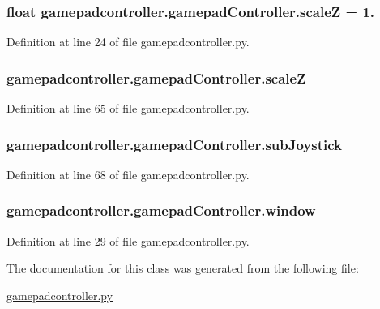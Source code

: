 \hypertarget{classgamepadcontroller_1_1gamepadController_a3d34de8357dd41a4a63cdb3dd38569d1}{
\subsubsection[{scale\-Z}]{\setlength{\rightskip}{0pt plus 5cm}float gamepadcontroller.\-gamepad\-Controller.\-scale\-Z = 1.\hspace{0.3cm}{\ttfamily [static]}}}\label{classgamepadcontroller_1_1gamepadController_a3d34de8357dd41a4a63cdb3dd38569d1}


Definition at line 24 of file gamepadcontroller.\-py.

\hypertarget{classgamepadcontroller_1_1gamepadController_a80be0bf69c042473e69428bb39988494}{
\subsubsection[{scale\-Z}]{\setlength{\rightskip}{0pt plus 5cm}gamepadcontroller.\-gamepad\-Controller.\-scale\-Z}}\label{classgamepadcontroller_1_1gamepadController_a80be0bf69c042473e69428bb39988494}


Definition at line 65 of file gamepadcontroller.\-py.

\hypertarget{classgamepadcontroller_1_1gamepadController_aa6797c1d03e7d3c9aa483ae386b25c52}{
\subsubsection[{sub\-Joystick}]{\setlength{\rightskip}{0pt plus 5cm}gamepadcontroller.\-gamepad\-Controller.\-sub\-Joystick}}\label{classgamepadcontroller_1_1gamepadController_aa6797c1d03e7d3c9aa483ae386b25c52}


Definition at line 68 of file gamepadcontroller.\-py.

\hypertarget{classgamepadcontroller_1_1gamepadController_ab004a378de876574e55c879d5ea862ec}{
\subsubsection[{window}]{\setlength{\rightskip}{0pt plus 5cm}gamepadcontroller.\-gamepad\-Controller.\-window}}\label{classgamepadcontroller_1_1gamepadController_ab004a378de876574e55c879d5ea862ec}


Definition at line 29 of file gamepadcontroller.\-py.



The documentation for this class was generated from the following file\-:\begin{DoxyCompactItemize}
\item 
\hyperlink{gamepadcontroller_8py}{gamepadcontroller.\-py}\end{DoxyCompactItemize}
